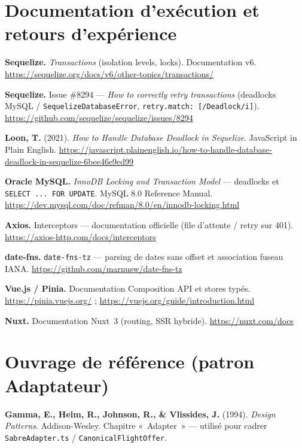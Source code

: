 \section*{Documentation d'exécution et retours d'expérience}
\begin{enumerate}[label={[T-\arabic*]},leftmargin=*,itemsep=5pt]
    \item \textbf{Sequelize.} \textit{Transactions} (isolation levels, locks). Documentation v6. \url{https://sequelize.org/docs/v6/other-topics/transactions/}
    \item \textbf{Sequelize.} Issue \#8294 --- \textit{How to correctly retry transactions} (deadlocks MySQL / \texttt{SequelizeDatabaseError}, \texttt{retry.match: [/Deadlock/i]}). \url{https://github.com/sequelize/sequelize/issues/8294}
    \item \textbf{Loon, T.} (2021). \textit{How to Handle Database Deadlock in Sequelize}. JavaScript in Plain English. \url{https://javascript.plainenglish.io/how-to-handle-database-deadlock-in-sequelize-6bee46e9ed99}
    \item \textbf{Oracle MySQL.} \textit{InnoDB Locking and Transaction Model} --- deadlocks et \texttt{SELECT ... FOR UPDATE}. MySQL 8.0 Reference Manual. \url{https://dev.mysql.com/doc/refman/8.0/en/innodb-locking.html}
    \item \textbf{Axios.} Interceptors --- documentation officielle (file d'attente / retry sur 401). \url{https://axios-http.com/docs/interceptors}
    \item \textbf{date-fns.} \texttt{date-fns-tz} --- parsing de dates sans offset et association fuseau IANA. \url{https://github.com/marnusw/date-fns-tz}
    \item \textbf{Vue.js / Pinia.} Documentation Composition API et stores typés. \url{https://pinia.vuejs.org/} ; \url{https://vuejs.org/guide/introduction.html}
    \item \textbf{Nuxt.} Documentation Nuxt~3 (routing, SSR hybride). \url{https://nuxt.com/docs}
\end{enumerate}

\section*{Ouvrage de référence (patron Adaptateur)}
\begin{enumerate}[label={[B-\arabic*]},leftmargin=*,itemsep=5pt]
    \item \textbf{Gamma, E., Helm, R., Johnson, R., \& Vlissides, J.} (1994). \textit{Design Patterns}. Addison-Wesley. Chapitre «~Adapter~» --- utilisé pour cadrer \texttt{SabreAdapter.ts} / \texttt{CanonicalFlightOffer}.
\end{enumerate}
